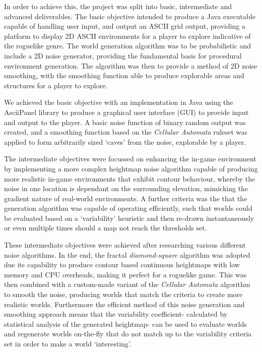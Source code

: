 \documentclass[12pt,a4paper]{article}
\begin{document}
In order to achieve this, the project was split into basic, intermediate and advanced deliverables. The basic objective intended to produce a Java executable capable of handling user input, and output an ASCII grid output, providing a platform to display 2D ASCII environments for a player to explore indicative of the roguelike genre. The world generation algorithm was to be probabilistic and include a 2D noise generator, providing the fundamental basis for procedural environment generation. The algorithm was then to provide a method of 2D noise smoothing, with the smoothing function able to produce explorable areas and structures for a player to explore. 

We achieved the basic objective with an implementation in Java using the AsciiPanel library to produce a graphical user interface (GUI) to provide input and output to the player. A basic noise function of binary random output was created, and a smoothing function based on the \emph{Cellular Automata} ruleset was applied to form arbitrarily sized `caves' from the noise, explorable by a player.

The intermediate objectives were focussed on enhancing the in-game environment by implementing a more complex heightmap noise algorithm capable of producing more realistic in-game environments that exhibit contour behaviour, whereby the noise in one location is dependant on the surrounding elevation, mimicking the gradient nature of real-world environments. A further criteria was the that the generation algorithm was capable of operating efficiently, such that worlds could be evaluated based on a `variability' heuristic and then re-drawn instantaneously or even multiple times should a map not reach the thresholds set.


These intermediate objectives were achieved after researching various different noise algorithms. In the end, the fractal \emph{diamond-square} algorithm was adopted due its capability to produce contour based continuous heightmaps with low memory and CPU overheads, making it perfect for a roguelike game. This was then combined with a custom-made variant of the \emph{Cellular Automata} algorithm to smooth the noise, producing worlds that match the criteria to create more realistic worlds. Furthermore the efficient method of this noise generation and smoothing approach means that the variability coefficient- calculated by statistical analysis of the generated heightmap- can be used to evaluate worlds and regenerate worlds  on-the-fly that do not match up to the variability criteria set in order to make a world `interesting'. 
\end{document}
